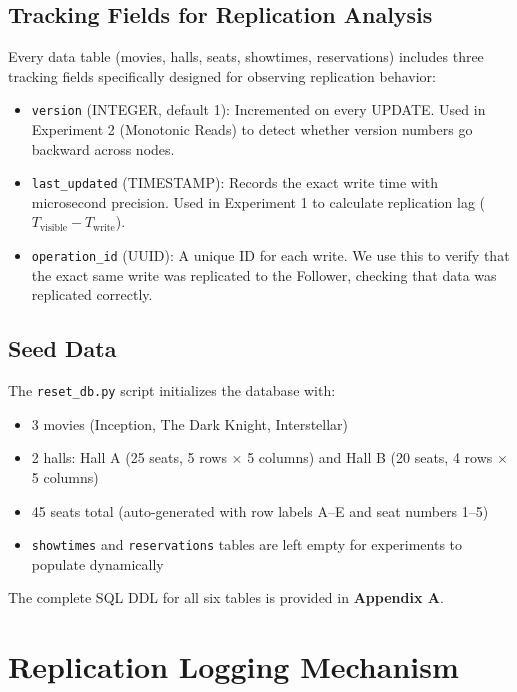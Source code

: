 \documentclass[12pt]{article}
\begin{document}
\subsection{Tracking Fields for Replication Analysis}
Every data table (movies, halls, seats, showtimes, reservations) includes three tracking fields specifically designed for observing replication behavior:

\begin{itemize}
    \item \texttt{version} (INTEGER, default 1): Incremented on every UPDATE. Used in Experiment 2 (Monotonic Reads) to detect whether version numbers go backward across nodes.
    \item \texttt{last\_updated} (TIMESTAMP): Records the exact write time with microsecond precision. Used in Experiment 1 to calculate replication lag ($T_{\text{visible}} - T_{\text{write}}$).
    \item \texttt{operation\_id} (UUID): A unique ID for each write. We use this to verify that the exact same write was replicated to the Follower, checking that data was replicated correctly.
\end{itemize}

\subsection{Seed Data}
The \texttt{reset\_db.py} script initializes the database with:
\begin{itemize}
    \item 3 movies (Inception, The Dark Knight, Interstellar)
    \item 2 halls: Hall A (25 seats, 5 rows $\times$ 5 columns) and Hall B (20 seats, 4 rows $\times$ 5 columns)
    \item 45 seats total (auto-generated with row labels A--E and seat numbers 1--5)
    \item \texttt{showtimes} and \texttt{reservations} tables are left empty for experiments to populate dynamically
\end{itemize}

The complete SQL DDL for all six tables is provided in \textbf{Appendix A}.

\section{Replication Logging Mechanism}
\end{document}
